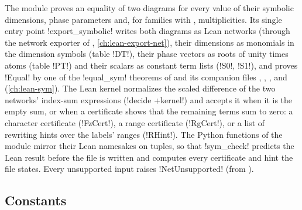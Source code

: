 {{{The module  proves an equality of two diagrams for
every value of their symbolic dimensions, phase parameters and, for families with \bboxes,
multiplicities. Its single entry point \lexpy!export_symbolic! writes both diagrams as Lean
networks (through the network exporter of ,
\cref{ch:lean-export-net}), their dimensions as monomials in the dimension symbols (table
\lexlean!DT!), their phase vectors as roots of unity times atoms (table \lexlean!PT!) and their
scalars as constant term lists (\lexlean!S0!, \lexlean!S1!), and proves \lexlean!Equal! by one of the
\lexlean!equal_sym! theorems of  and its companion files
, , ,  and
 (\cref{ch:lean-sym}). The Lean kernel normalizes the scaled difference of
the two networks' index-sum expressions (\lexlean!decide +kernel!) and accepts it when it is the
empty sum, or when a certificate shows that the remaining terms sum to zero: a character
certificate (\lexlean!FzCert!), a range certificate (\lexlean!RgCert!), or a list of rewriting hints
over the labels' ranges (\lexlean!RHint!). The Python functions of the module mirror their Lean
namesakes on tuples, so that \lexpy!sym_check! predicts the Lean result before the file is
written and computes every certificate and hint the file states. Every unsupported input
raises \lexpy!NetUnsupported! (from ).

\subsection{Constants}\label{sec:lean-export-sym-constants}

}}}
